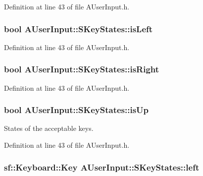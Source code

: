 Definition at line 43 of file A\-User\-Input.\-h.

\hypertarget{structAUserInput_1_1SKeyStates_ab29367ed4bde7e4dd9884d75f300e5ec}{
\subsubsection[{is\-Left}]{\setlength{\rightskip}{0pt plus 5cm}bool A\-User\-Input\-::\-S\-Key\-States\-::is\-Left}}\label{structAUserInput_1_1SKeyStates_ab29367ed4bde7e4dd9884d75f300e5ec}


Definition at line 43 of file A\-User\-Input.\-h.

\hypertarget{structAUserInput_1_1SKeyStates_afcf8a092b05f9ce67f4b2c5ea73a1f40}{
\subsubsection[{is\-Right}]{\setlength{\rightskip}{0pt plus 5cm}bool A\-User\-Input\-::\-S\-Key\-States\-::is\-Right}}\label{structAUserInput_1_1SKeyStates_afcf8a092b05f9ce67f4b2c5ea73a1f40}


Definition at line 43 of file A\-User\-Input.\-h.

\hypertarget{structAUserInput_1_1SKeyStates_ab227ece210dcf94947d71b21b6ea906e}{
\subsubsection[{is\-Up}]{\setlength{\rightskip}{0pt plus 5cm}bool A\-User\-Input\-::\-S\-Key\-States\-::is\-Up}}\label{structAUserInput_1_1SKeyStates_ab227ece210dcf94947d71b21b6ea906e}


States of the acceptable keys. 



Definition at line 43 of file A\-User\-Input.\-h.

\hypertarget{structAUserInput_1_1SKeyStates_aea4dc08983d8f716718a3792c779ff5c}{
\subsubsection[{left}]{\setlength{\rightskip}{0pt plus 5cm}sf\-::\-Keyboard\-::\-Key A\-User\-Input\-::\-S\-Key\-States\-::left}}\label{structAUserInput_1_1SKeyStates_aea4dc08983d8f716718a3792c779ff5c}


